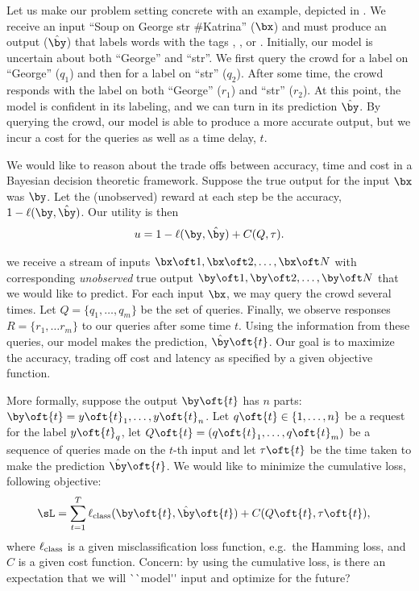 Let us make our problem setting concrete with an example, depicted in .
We receive an input ``Soup on George str \#Katrina'' ($\bx$) and must produce an output ($\byt$) that labels words with the tags \scper{}, \scloc{}, \scres{} or \scnone{}.
Initially, our model is uncertain about both ``George'' and ``str''.
We first query the crowd for a label on ``George'' ($q_1$) and then for a label on ``str'' ($q_2$). 
After some time, the crowd responds with the label \scloc{} on both ``George'' ($r_1$) and ``str'' ($r_2$).
At this point, the model is confident in its labeling, and we can turn in its prediction $\byt$.
By querying the crowd, our model is able to produce a more accurate output, but we incur a cost for the queries as well as a time delay, $t$.

We would like to reason about the trade offs between accuracy, time and cost in a Bayesian decision theoretic framework.
Suppose the true output for the input $\bx$ was $\by$.
Let the (unobserved) reward at each step be the accuracy, $1 - \ell(\by, \byt)$.
Our utility is then 
\begin{align*}
u = 1 - \ell(\by, \byt) + C(Q, \tau).
\end{align*}


we receive a stream of inputs $\bx\oft1, \bx\oft2, \ldots, \bx\oft N$ with corresponding {\em unobserved\/} true output $\by\oft1, \by\oft2, \ldots, \by\oft N$ that we would like to predict.
For each input $\bx$, we may query the crowd several times. Let $Q = \{q_1, \ldots, q_m\}$ be the set of queries.
Finally, we observe responses $R = \{r_1, \ldots r_m\}$ to our queries after some time $t$.
Using the information from these queries, our model makes the prediction, $\byt\oft{t}$.
Our goal is to maximize the accuracy, trading off cost and latency as specified by a given objective function.

More formally, suppose the output $\by\oft{t}$ has $n$ parts: $\by\oft{t} = y\oft{t}_1, \dots, y\oft{t}_n$.
Let $q\oft{t} \in \{1, \ldots, n\}$ be a request for the label $y\oft{t}_q$,
let $Q\oft{t} = (q\oft{t}_1, \dots, q\oft{t}_m)$ be a sequence of queries made on the $t$-th input and
let $\tau\oft{t}$ be the time taken to make the prediction $\byt\oft{t}$. 
We would like to minimize the cumulative loss, 
following objective:
\begin{align}
  \sL &= \sum_{t=1}^T \ell_{\rmclass}(\by\oft{t}, \byt\oft{t}) + C(Q\oft{t}, \tau\oft{t}), \label{eqn:objective}
\end{align}
where $\ell_{\textrm{class}}$ is a given misclassification loss function, e.g.\ the Hamming loss, and $C$ is a given cost function.
\ac{Concern: by using the cumulative loss, is there an expectation that we will ``model'' input and optimize for the future?}

